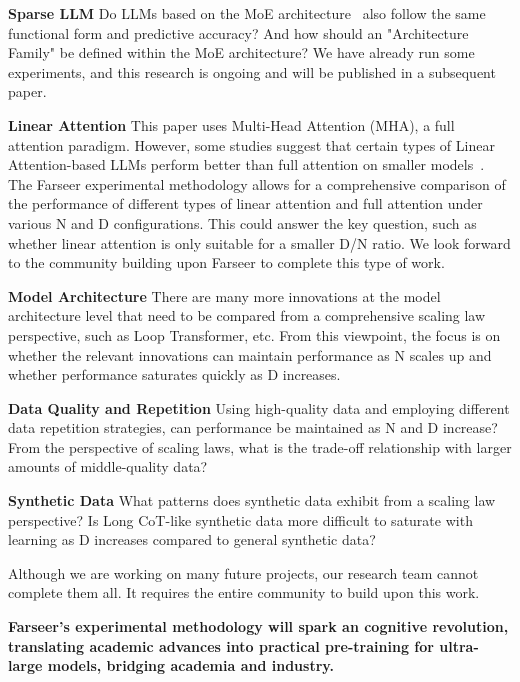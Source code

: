 \documentclass{article}
\begin{document}
\textbf{Sparse LLM} Do LLMs based on the MoE architecture~\cite{cai2024survey} also follow the same functional form and predictive accuracy? And how should an "Architecture Family" be defined within the MoE architecture? We have already run some experiments, and this research is ongoing and will be published in a subsequent paper.


\textbf{Linear Attention} This paper uses Multi-Head Attention (MHA), a full attention paradigm. However, some studies suggest that certain types of Linear Attention-based LLMs perform better than full attention on smaller models~\cite{gu2023mamba}. 
The Farseer experimental methodology allows for a comprehensive comparison of the performance of different types of linear attention and full attention under various N and D configurations. 
This could answer the key question, such as whether linear attention is only suitable for a smaller D/N ratio. 
We look forward to the community building upon Farseer to complete this type of work.

\textbf{Model Architecture} 
There are many more innovations at the model architecture level that need to be compared from a comprehensive scaling law perspective, such as Loop Transformer, etc. 
From this viewpoint, the focus is on whether the relevant innovations can maintain performance as N scales up and whether performance saturates quickly as D increases.

\textbf{Data Quality and Repetition} 
Using high-quality data and employing different data repetition strategies, can performance be maintained as N and D increase? From the perspective of scaling laws, what is the trade-off relationship with larger amounts of middle-quality data?

\textbf{Synthetic Data} 
What patterns does synthetic data exhibit from a scaling law perspective? 
Is Long CoT-like synthetic data more difficult to saturate with learning as D increases compared to general synthetic data?

Although we are working on many future projects, our research team cannot complete them all. It requires the entire community to build upon this work.

\textbf{Farseer’s experimental methodology will spark an cognitive revolution, translating academic advances into practical pre-training for ultra-large models, bridging academia and industry.}
\end{document}
